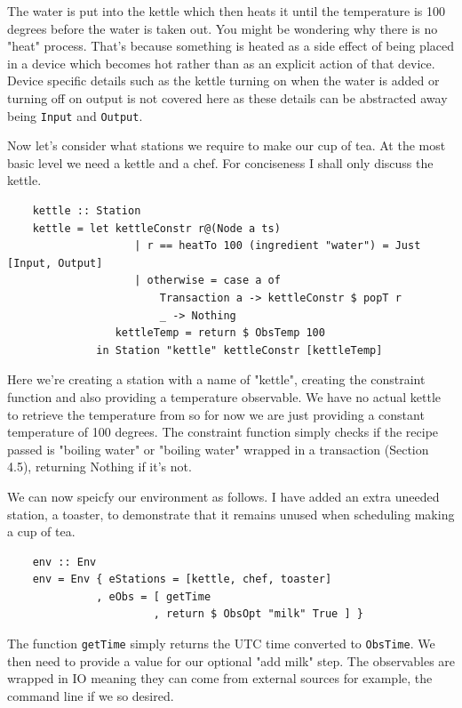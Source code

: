 \documentclass[11pt]{article}
\begin{document}
The water is put into the kettle which then heats it until the temperature is 100 degrees
before the water is taken out. You might be wondering why there is no "heat" process.
That's because something is heated as a side effect of being placed in a device which becomes hot
rather than as an explicit action of that device. Device specific details such as the kettle turning
on when the water is added or turning off on output is not covered here as these details can
be abstracted away being \texttt{Input} and \texttt{Output}.

\medbreak

Now let's consider what stations we require to make our cup of tea. At the most basic level
we need a kettle and a chef. For conciseness I shall only discuss the kettle.

\begin{lstlisting}
    kettle :: Station
    kettle = let kettleConstr r@(Node a ts)
                    | r == heatTo 100 (ingredient "water") = Just [Input, Output]
                    | otherwise = case a of
                        Transaction a -> kettleConstr $ popT r
                        _ -> Nothing
                 kettleTemp = return $ ObsTemp 100
              in Station "kettle" kettleConstr [kettleTemp]
\end{lstlisting}

Here we're creating a station with a name of "kettle", creating the constraint function
and also providing a temperature observable. We have no actual kettle to retrieve the temperature
from so for now we are just providing a constant temperature of 100 degrees. The constraint function
simply checks if the recipe passed is "boiling water" or "boiling water" wrapped in a transaction (Section 4.5),
returning Nothing if it's not.

\medbreak

We can now speicfy our environment as follows. I have added an extra uneeded station, a toaster,
to demonstrate that it remains unused when scheduling making a cup of tea.

\begin{lstlisting}
    env :: Env
    env = Env { eStations = [kettle, chef, toaster]
              , eObs = [ getTime
                       , return $ ObsOpt "milk" True ] }
\end{lstlisting}

The function \texttt{getTime} simply returns the UTC time converted to \texttt{ObsTime}.
We then need to provide a value for our optional "add milk" step. The observables are
wrapped in IO meaning they can come from external sources for example, the command line
if we so desired.
\end{document}
